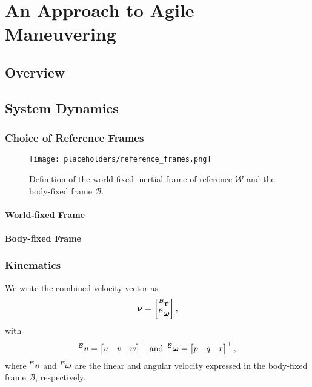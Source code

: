 
\chapter{An Approach to Agile Maneuvering}
\label{sec:approach-to-agile-maneuvering}

\section{Overview}

\section{System Dynamics}
\label{sec:system-dynamics}

\subsection{Choice of Reference Frames}
\begin{figure}[h!]
	\centering
	\texttt{[image: placeholders/reference\_frames.png]}
	\caption{Definition of the world-fixed inertial frame of reference $\mathcal{W}$ and the body-fixed frame $\mathcal{B}$.}
\end{figure}
\subsubsection{World-fixed Frame}
\subsubsection{Body-fixed Frame}

\subsection{Kinematics}

We write the combined velocity vector \nub as
\begin{equation}
	\mbox{$\bm{\nu}$} = 
	\begin{bmatrix}
		\prescript{\mathcal{B}}{}{\mbox{$\bm{v}$}} \\
		\prescript{\mathcal{B}}{}{\mbox{$\bm{\omega}$}}
	\end{bmatrix}
	,
\end{equation}
with 
\begin{equation}
	\label{eq:velocities-in-body-frame}
	\prescript{\mathcal{B}}{}{\mbox{$\bm{v}$}} = 
	\begin{bmatrix}
		u & v & w
	\end{bmatrix}^\top
	\text{ and }
	\prescript{\mathcal{B}}{}{\mbox{$\bm{\omega}$}} = 
	\begin{bmatrix}
		p & q & r
	\end{bmatrix}^\top
	,
\end{equation}
where $\prescript{\mathcal{B}}{}{\mbox{$\bm{v}$}}$ and $\prescript{\mathcal{B}}{}{\mbox{$\bm{\omega}$}}$ are the linear and angular velocity expressed in the body-fixed frame $\mathcal{B}$, respectively.

